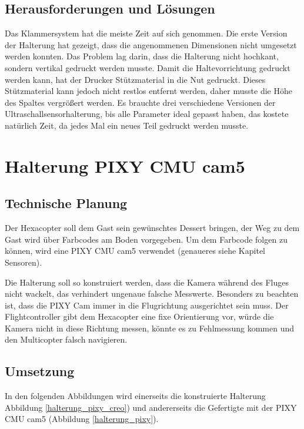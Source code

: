 	\subsection{Herausforderungen und Lösungen}

	Das Klammersystem hat die meiste Zeit auf sich genommen.
	Die erste Version der Halterung hat gezeigt, dass die angenommenen Dimensionen nicht umgesetzt werden konnten.
	Das Problem lag darin, dass die Halterung nicht hochkant, sondern vertikal gedruckt werden musste.
	Damit die Haltevorrichtung gedruckt werden kann, hat der Drucker Stützmaterial in die Nut gedruckt.
	Dieses Stützmaterial kann jedoch nicht restlos entfernt werden, daher musste die Höhe des Spaltes vergrößert werden.
	Es brauchte drei verschiedene Versionen der Ultraschallsensorhalterung, bis alle Parameter ideal gepasst haben, das kostete natürlich Zeit, da jedes Mal ein neues Teil gedruckt werden musste.

			\newpage

\section{Halterung PIXY CMU cam5}

	\subsection{Technische Planung}

	Der Hexacopter soll dem Gast sein gewünschtes Dessert bringen, der Weg zu dem Gast wird über Farbcodes am Boden vorgegeben.
	Um dem Farbcode folgen zu können, wird eine PIXY CMU cam5 verwendet (genaueres siehe Kapitel Sensoren).

	Die Halterung soll so konstruiert werden, dass die Kamera während des Fluges nicht wackelt, das verhindert ungenaue \bzw falsche Messwerte.
	Besonders zu beachten ist, dass die PIXY Cam immer in die Flugrichtung ausgerichtet sein muss.
	Der Flightcontroller gibt dem Hexacopter eine fixe Orientierung vor, würde die Kamera nicht in diese Richtung messen, könnte es zu Fehlmessung kommen und den Multicopter falsch navigieren.

	\subsection{Umsetzung}

	In den folgenden Abbildungen wird einerseits die konstruierte Halterung Abbildung \ref{halterung_pixy_creo})
	und andererseits die Gefertigte  mit der PIXY CMU cam5 (Abbildung \ref{halterung_pixy}).

